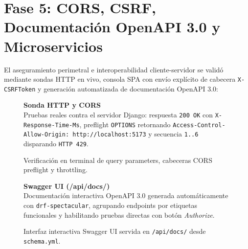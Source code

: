 \documentclass[10pt,a4paper]{article}
\begin{document}
\newpage

\section{Fase 5: CORS, CSRF, Documentación OpenAPI 3.0 y Microservicios}
El aseguramiento perimetral e interoperabilidad cliente-servidor se validó mediante sondas HTTP en vivo, consola SPA con envío explícito de cabecera \texttt{X-CSRFToken} y generación automatizada de documentación OpenAPI 3.0:

\begin{figure}[H]
\centering
\begin{minipage}[c]{0.73\textwidth}
    \centering
\end{minipage}\hfill
\begin{minipage}[c]{0.24\textwidth}
    \raggedright
    \textbf{\color{uncpnavy}\small Sonda HTTP y CORS}\\[4pt]
    \footnotesize
    \color{uncpdark}
    Pruebas reales contra el servidor Django: respuesta \texttt{200 OK} con \texttt{X-Response-Time-Ms}, preflight \texttt{OPTIONS} retornando \texttt{Access-Control-Allow-Origin: http://localhost:5173} y secuencia \texttt{1..6} disparando \texttt{HTTP 429}.
\end{minipage}
\vspace{-0.2cm}
\caption{Verificación en terminal de query parameters, cabeceras CORS preflight y throttling.}
\label{fig:term_http}
\end{figure}

\begin{figure}[H]
\centering
\begin{minipage}[c]{0.73\textwidth}
    \centering
\end{minipage}\hfill
\begin{minipage}[c]{0.24\textwidth}
    \raggedright
    \textbf{\color{uncpnavy}\small Swagger UI (/api/docs/)}\\[4pt]
    \footnotesize
    \color{uncpdark}
    Documentación interactiva OpenAPI 3.0 generada automáticamente con \texttt{drf-spectacular}, agrupando endpoints por etiquetas funcionales y habilitando pruebas directas con botón \textit{Authorize}.
\end{minipage}
\vspace{-0.2cm}
\caption{Interfaz interactiva Swagger UI servida en \texttt{/api/docs/} desde \texttt{schema.yml}.}
\label{fig:interfaz_swagger}
\end{figure}
\end{document}
